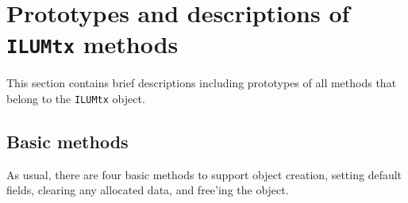 \par
\section{Prototypes and descriptions of {\tt ILUMtx} methods}
\label{section:ILUMtx:proto}
\par
This section contains brief descriptions including prototypes
of all methods that belong to the {\tt ILUMtx} object.
\par
\subsection{Basic methods}
\label{subsection:ILUMtx:proto:basics}
\par
As usual, there are four basic methods to support object creation,
setting default fields, clearing any allocated data, and free'ing
the object.
\par
